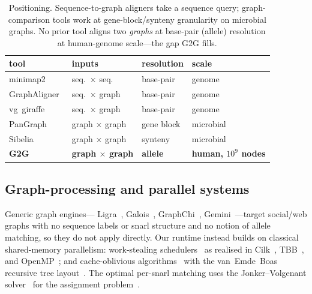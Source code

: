 \documentclass[conference]{IEEEtran}
\theoremstyle{plain}
\theoremstyle{definition}
\begin{document}
\begin{table}[t]
  \centering
  \caption{Positioning. Sequence-to-graph aligners take a sequence query;
  graph-comparison tools work at gene-block/synteny granularity on microbial
  graphs. No prior tool aligns two \emph{graphs} at base-pair (allele) resolution
  at human-genome scale---the gap \textsc{G2G} fills.}
  \label{tab:positioning}
  \footnotesize
  \setlength{\tabcolsep}{4pt}
  \begin{tabular}{llll}
    \toprule
    tool & inputs & resolution & scale \\
    \midrule
    minimap2~\cite{li2018minimap2}                 & seq.\ $\times$ seq.\ & base-pair  & genome \\
    GraphAligner~\cite{rautiainen2020graphaligner} & seq.\ $\times$ graph & base-pair  & genome \\
    vg~giraffe~\cite{siren2021giraffe}             & seq.\ $\times$ graph & base-pair  & genome \\
    PanGraph~\cite{noll2023pangraph}               & graph $\times$ graph & gene block & microbial \\
    Sibelia~\cite{minkin2013sibelia}               & graph $\times$ graph & synteny    & microbial \\
    \midrule
    \textbf{\textsc{G2G}} & \textbf{graph $\times$ graph} & \textbf{allele} & \textbf{human, $10^9$ nodes} \\
    \bottomrule
  \end{tabular}
\end{table}

\subsection{Graph-processing and parallel systems} Generic graph engines---%
Ligra~\cite{shun2013ligra}, Galois~\cite{nguyen2013galois},
GraphChi~\cite{kyrola2012graphchi}, Gemini~\cite{zhu2016gemini}---target
social/web graphs with no sequence labels or snarl structure and no notion of
allele matching, so they do not apply directly. Our runtime instead builds on
classical shared-memory parallelism: work-stealing
schedulers~\cite{blumofe1999scheduling} as realised in
Cilk~\cite{frigo1998cilk}, TBB~\cite{reinders2007tbb}, and
OpenMP~\cite{dagum1998openmp}; and cache-oblivious
algorithms~\cite{frigo1999cache,prokop1999cache} with the van~Emde~Boas
recursive tree layout~\cite{vanemde1977preserving}. The optimal per-snarl
matching uses the Jonker--Volgenant solver~\cite{jonker1987shortest} for the
assignment problem~\cite{kuhn1955hungarian}.
\end{document}

